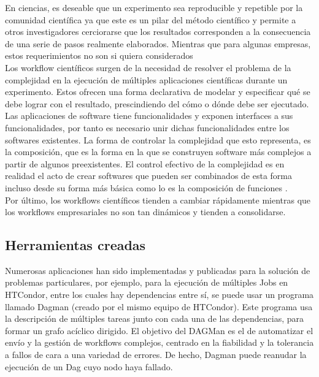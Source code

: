 En ciencias, es deseable que un experimento sea reproducible y repetible por la comunidad científica ya que este es un pilar del método científico y permite a otros investigadores cerciorarse que los resultados corresponden a la consecuencia de una serie de pasos realmente elaborados. Mientras que para algunas empresas, estos requerimientos no son si quiera considerados\\

Los workflow científicos surgen de la necesidad de resolver el problema de la complejidad en la ejecución de múltiples aplicaciones científicas durante un experimento. Estos ofrecen una forma declarativa de modelar y especificar qué se debe lograr con el resultado, prescindiendo del cómo o dónde debe ser ejecutado. Las aplicaciones de software tiene funcionalidades  y exponen interfaces a sus funcionalidades,  por tanto es necesario unir dichas funcionalidades entre los softwares existentes. La forma de controlar la complejidad que esto representa, es la composición, que es la forma en la que se construyen software más complejos a partir de algunos preexistentes. El control efectivo de la complejidad es en realidad el acto de crear softwares que pueden ser combinados de esta forma incluso desde su forma más básica como lo es la composición de funciones \cite{wforescience:2007}. \\

Por último, los workflows científicos tienden a cambiar rápidamente mientras que los workflows empresariales no son tan dinámicos y tienden a consolidarse. \\

\subsection{Herramientas creadas}

Numerosas aplicaciones han sido implementadas y publicadas para la solución de problemas particulares, por ejemplo, para la ejecución de múltiples Jobs en HTCondor, entre los cuales hay dependencias entre sí, se puede usar un programa llamado Dagman (creado por el mismo equipo de HTCondor). Este programa usa la descripción de múltiples tareas junto con cada una de las dependencias, para formar un grafo acíclico dirigido. El objetivo del DAGMan es el de automatizar el envío y la gestión de workflows complejos, centrado en la fiabilidad y la tolerancia a fallos de cara a una variedad de errores. De hecho, Dagman puede reanudar la ejecución de un Dag cuyo nodo haya fallado. \\

